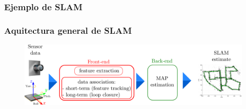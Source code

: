 \begin{frame}
    \frametitle{Ejemplo de SLAM}
    
    \begin{figure}
        \hfill{}
    \end{figure}
    
\end{frame}

\begin{frame}
	\frametitle{Aquitectura general de SLAM}
	
	\begin{figure}[!h]
			\includegraphics[width=\textwidth]{images/slam_frontend_backend.pdf}
	\end{figure}
	
\end{frame}

